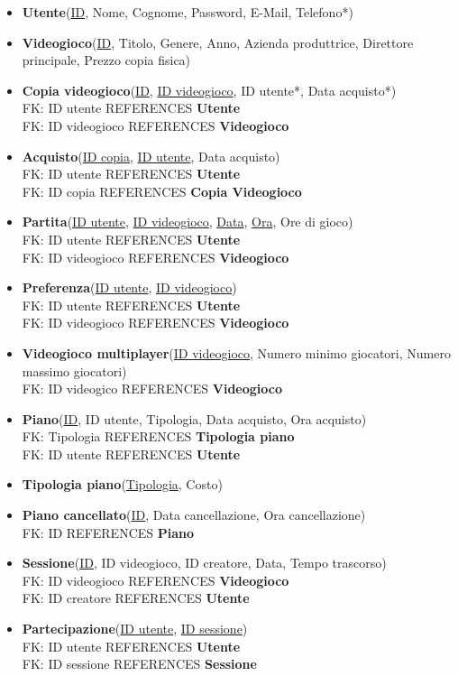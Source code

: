 \documentclass[a4paper,12pt]{report}
\begin{document}
\begin{itemize}

\item \textbf{Utente}(\underline{ID}, Nome, Cognome, Password, E-Mail, Telefono*)
\item \textbf{Videogioco}(\underline{ID}, Titolo, Genere, Anno, Azienda produttrice, Direttore principale, Prezzo copia fisica)
\item \textbf{Copia videogioco}(\underline{ID}, \underline{ID videogioco}, ID utente*, Data acquisto*) \\
FK: ID utente REFERENCES \textbf{Utente} \\
FK: ID videogioco REFERENCES \textbf{Videogioco}
\item \textbf{Acquisto}(\underline{ID copia}, \underline{ID utente}, Data acquisto) \\
FK: ID utente REFERENCES \textbf{Utente} \\
FK: ID copia REFERENCES \textbf{Copia Videogioco}
\item \textbf{Partita}(\underline{ID utente}, \underline{ID videogioco}, \underline{Data}, \underline{Ora}, Ore di gioco) \\
FK: ID utente REFERENCES \textbf{Utente} \\
FK: ID videogioco REFERENCES \textbf{Videogioco}
\item \textbf{Preferenza}(\underline{ID utente}, \underline{ID videogioco}) \\
FK: ID utente REFERENCES \textbf{Utente} \\
FK: ID videogioco REFERENCES \textbf{Videogioco}
\item \textbf{Videogioco multiplayer}(\underline{ID videogioco}, Numero minimo giocatori, Numero massimo giocatori) \\
FK: ID videogico REFERENCES \textbf{Videogioco}
\item \textbf{Piano}(\underline{ID}, ID utente, Tipologia, Data acquisto, Ora acquisto) \\
FK: Tipologia REFERENCES \textbf{Tipologia piano} \\
FK: ID utente REFERENCES \textbf{Utente}
\item \textbf{Tipologia piano}(\underline{Tipologia}, Costo)
\item \textbf{Piano cancellato}(\underline{ID}, Data cancellazione, Ora cancellazione) \\
FK: ID REFERENCES \textbf{Piano}
\item \textbf{Sessione}(\underline{ID}, ID videogioco, ID creatore, Data, Tempo trascorso) \\
FK: ID videogioco REFERENCES \textbf{Videogioco} \\
FK: ID creatore REFERENCES \textbf{Utente}
\item \textbf{Partecipazione}(\underline{ID utente}, \underline{ID sessione}) \\
FK: ID utente REFERENCES \textbf{Utente} \\
FK: ID sessione REFERENCES \textbf{Sessione}
\end{itemize}
\end{document}

